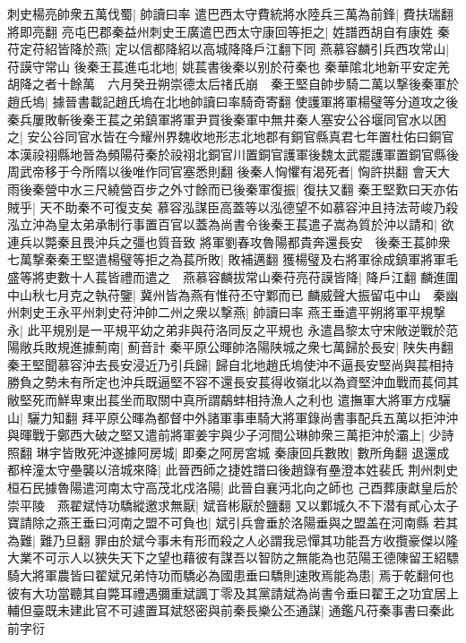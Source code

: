 刺史楊亮帥衆五萬伐蜀|{
	帥讀曰率}
遣巴西太守費統將水陸兵三萬為前鋒|{
	費扶瑞翻將即亮翻}
亮屯巴郡秦益州刺史王廣遣巴西太守康回等拒之|{
	姓譜西胡自有康姓}
秦苻定苻紹皆降於燕|{
	定以信都降紹以高城降降戶江翻下同}
燕慕容麟引兵西攻常山|{
	苻謨守常山}
後秦王萇進屯北地|{
	姚萇書後秦以别於苻秦也}
秦華隂北地新平安定羌胡降之者十餘萬　六月癸丑朔崇德太后禇氏崩　秦王堅自帥步騎二萬以撃後秦軍於趙氏塢|{
	據晉書載記趙氏塢在北地帥讀曰率騎奇寄翻}
使護軍將軍楊璧等分道攻之後秦兵屢敗斬後秦王萇之弟鎮軍將軍尹買後秦軍中無井秦人塞安公谷堰同官水以困之|{
	安公谷同官水皆在今耀州界魏收地形志北地郡有銅官縣真君七年置杜佑曰銅官本漢祋祤縣地晉為頻陽苻秦於祋祤北銅官川置銅官護軍後魏太武罷護軍置銅官縣後周武帝移于今所隋以後唯作同官塞悉則翻}
後秦人恟懼有渴死者|{
	恟許拱翻}
會天大雨後秦營中水三尺繞營百步之外寸餘而已後秦軍復振|{
	復扶又翻}
秦王堅歎曰天亦佑賊乎|{
	天不助秦不可復支矣}
慕容泓謀臣高蓋等以泓德望不如慕容沖且持法苛峻乃殺泓立沖為皇太弟承制行事置百官以蓋為尚書令後秦王萇遣子嵩為質於沖以請和|{
	欲連兵以斃秦且畏沖兵之彊也質音致}
將軍劉春攻魯陽都貴奔還長安　後秦王萇帥衆七萬撃秦秦王堅遣楊璧等拒之為萇所敗|{
	敗補邁翻}
獲楊璧及右將軍徐成鎮軍將軍毛盛等將吏數十人萇皆禮而遣之　燕慕容麟拔常山秦苻亮苻謨皆降|{
	降戶江翻}
麟進圍中山秋七月克之執苻鑒|{
	冀州皆為燕有惟苻丕守鄴而已}
麟威聲大振留屯中山　秦幽州刺史王永平州刺史苻沖帥二州之衆以撃燕|{
	帥讀曰率}
燕王垂遣平朔將軍平規撃永|{
	此平規别是一平規平幼之弟非與苻洛同反之平規也}
永遣昌黎太守宋敞逆戰於范陽敞兵敗規進據薊南|{
	薊音計}
秦平原公暉帥洛陽陕城之衆七萬歸於長安|{
	陕失冉翻}
秦王堅聞慕容沖去長安浸近乃引兵歸|{
	歸自北地趙氏塢使沖不逼長安堅尚與萇相持勝負之勢未有所定也沖兵既逼堅不容不還長安萇得收嶺北以為資堅沖血戰而萇伺其敝堅死而鮮卑東出萇坐而取關中真所謂鷸蚌相持漁人之利也}
遣撫軍大將軍方戍驪山|{
	驪力知翻}
拜平原公暉為都督中外諸軍事車騎大將軍錄尚書事配兵五萬以拒沖沖與暉戰于鄭西大破之堅又遣前將軍姜宇與少子河間公琳帥衆三萬拒沖於灞上|{
	少詩照翻}
琳宇皆敗死沖遂據阿房城|{
	即秦之阿房宮城}
秦康回兵數敗|{
	數所角翻}
退還成都梓潼太守壘襲以涪城來降|{
	此晉西師之捷姓譜曰後趙錄有壘澄本姓裴氏}
荆州刺史桓石民據魯陽遣河南太守高茂北戍洛陽|{
	此晉自襄沔北向之師也}
己酉葬康獻皇后於崇平陵　燕翟斌恃功驕縱邀求無厭|{
	斌音彬厭於鹽翻}
又以鄴城久不下潜有貳心太子寶請除之燕王垂曰河南之盟不可負也|{
	斌引兵會垂於洛陽垂與之盟盖在河南縣}
若其為難|{
	難乃旦翻}
罪由於斌今事未有形而殺之人必謂我忌憚其功能吾方收攬豪傑以隆大業不可示人以狹失天下之望也藉彼有謀吾以智防之無能為也范陽王德陳留王紹驃騎大將軍農皆曰翟斌兄弟恃功而驕必為國患垂曰驕則速敗焉能為患|{
	焉于乾翻何也}
彼有大功當聽其自斃耳禮遇彌重斌諷丁零及其黨請斌為尚書令垂曰翟王之功宜居上輔但臺既未建此官不可遽置耳斌怒密與前秦長樂公丕通謀|{
	通鑑凡苻秦事書曰秦此前字衍}
